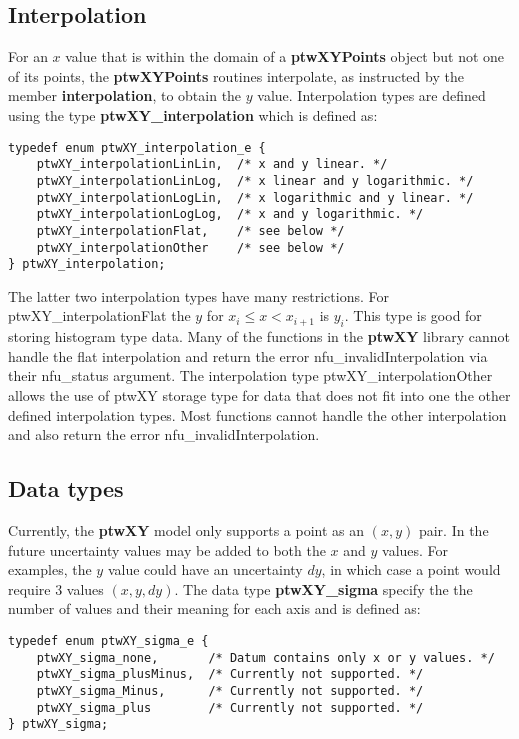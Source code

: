 \documentclass[11pt]{article}
\newcommand{\highlight}[1]{{\bf #1}}
\begin{document}
\subsection{Interpolation} \label{interpolationSection}
For an $x$ value that is within the domain of a \highlight{ptwXYPoints} object but not one of its points, the \highlight{ptwXYPoints} 
routines interpolate, as instructed by the member \highlight{interpolation}, to obtain the $y$ value. Interpolation types are
defined using the type \highlight{ptwXY\_interpolation} which is defined as:
\begin{verbatim}
typedef enum ptwXY_interpolation_e { 
    ptwXY_interpolationLinLin,  /* x and y linear. */
    ptwXY_interpolationLinLog,  /* x linear and y logarithmic. */
    ptwXY_interpolationLogLin,  /* x logarithmic and y linear. */
    ptwXY_interpolationLogLog,  /* x and y logarithmic. */
    ptwXY_interpolationFlat,    /* see below */
    ptwXY_interpolationOther    /* see below */
} ptwXY_interpolation;
\end{verbatim}
The latter two interpolation types have many restrictions. For ptwXY\_interpolationFlat the $y$ for $x_i \le x < x_{i+1}$ is $y_i$.
This type is good for storing histogram type data.
Many of the functions in the \highlight{ptwXY} library cannot handle the flat interpolation and return the error
nfu\_invalidInterpolation via their nfu\_status argument. The interpolation type ptwXY\_interpolationOther
allows the use of ptwXY storage type for data that does not fit into one the other defined interpolation types. Most
functions cannot handle the other interpolation and also return the error nfu\_invalidInterpolation.

\subsection{Data types}
Currently, the \highlight{ptwXY} model only supports a point as an $(x, y)$ pair. In the future uncertainty values may be added
to both the $x$ and $y$ values. For examples, the $y$ value could have an uncertainty $dy$, in which case a point would require
3 values $(x, y, dy)$. The data type \highlight{ptwXY\_sigma} specify the the number of values and their meaning for each axis
and is defined as:
\begin{verbatim}
typedef enum ptwXY_sigma_e {
    ptwXY_sigma_none,       /* Datum contains only x or y values. */
    ptwXY_sigma_plusMinus,  /* Currently not supported. */
    ptwXY_sigma_Minus,      /* Currently not supported. */
    ptwXY_sigma_plus        /* Currently not supported. */
} ptwXY_sigma;
\end{verbatim}
\end{document}
